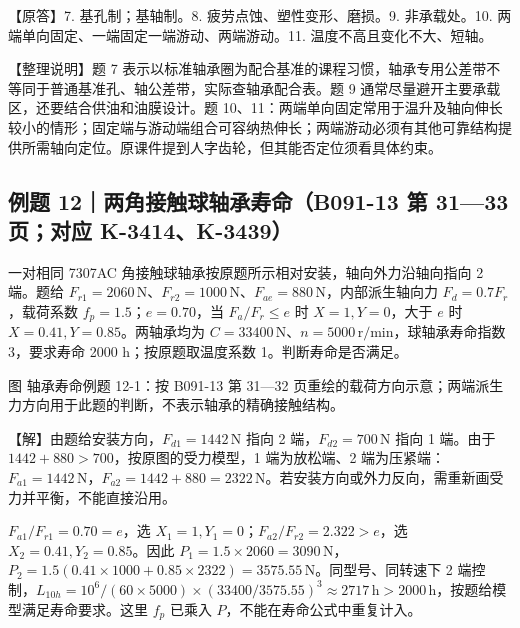 \documentclass[zihao=5,a4paper,UTF8,fontset=fandol]{ctexart}
\begin{document}
【原答】7. 基孔制；基轴制。8. 疲劳点蚀、塑性变形、磨损。9. 非承载处。10. 两端单向固定、一端固定一端游动、两端游动。11. 温度不高且变化不大、短轴。


【整理说明】题 7 表示以标准轴承圈为配合基准的课程习惯，轴承专用公差带不等同于普通基准孔、轴公差带，实际查轴承配合表。题 9 通常尽量避开主要承载区，还要结合供油和油膜设计。题 10、11：两端单向固定常用于温升及轴向伸长较小的情形；固定端与游动端组合可容纳热伸长；两端游动必须有其他可靠结构提供所需轴向定位。原课件提到人字齿轮，但其能否定位须看具体约束。




\subsection{例题 12｜两角接触球轴承寿命（B091-13 第 31—33 页；对应 K-3414、K-3439）}

一对相同 7307AC 角接触球轴承按原题所示相对安装，轴向外力沿轴向指向 2 端。题给 $F_{r1}=2060\,\mathrm{N}$、$F_{r2}=1000\,\mathrm{N}$、$F_{ae}=880\,\mathrm{N}$，内部派生轴向力 $F_d=0.7F_r$，载荷系数 $f_p=1.5$；$e=0.70$，当 $F_a/F_r\le e$ 时 $X=1,Y=0$，大于 $e$ 时 $X=0.41,Y=0.85$。两轴承均为 $C=33400\,\mathrm{N}$、$n=5000\,\mathrm{r/min}$，球轴承寿命指数 3，要求寿命 2000 h；按原题取温度系数 1。判断寿命是否满足。


\begin{center}
\end{center}


图 轴承寿命例题 12-1：按 B091-13 第 31—32 页重绘的载荷方向示意；两端派生力方向用于此题的判断，不表示轴承的精确接触结构。


【解】由题给安装方向，$F_{d1}=1442\,\mathrm{N}$ 指向 2 端，$F_{d2}=700\,\mathrm{N}$ 指向 1 端。由于 $1442+880>700$，按原图的受力模型，1 端为放松端、2 端为压紧端：$F_{a1}=1442\,\mathrm{N}$，$F_{a2}=1442+880=2322\,\mathrm{N}$。若安装方向或外力反向，需重新画受力并平衡，不能直接沿用。


$F_{a1}/F_{r1}=0.70=e$，选 $X_1=1,Y_1=0$；$F_{a2}/F_{r2}=2.322>e$，选 $X_2=0.41,Y_2=0.85$。因此 $P_1=1.5\times2060=3090\,\mathrm{N}$，$P_2=1.5(0.41\times1000+0.85\times2322)=3575.55\,\mathrm{N}$。同型号、同转速下 2 端控制，$L_{10h}=10^6/(60\times5000)\times(33400/3575.55)^3\approx2717\,\mathrm{h}>2000\,\mathrm{h}$，按题给模型满足寿命要求。这里 $f_p$ 已乘入 $P$，不能在寿命公式中重复计入。
\end{document}
